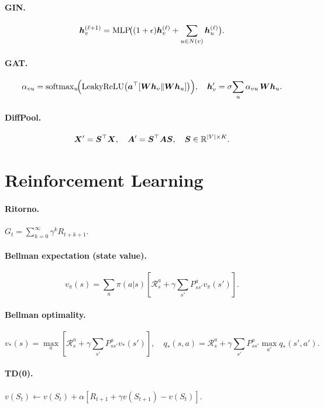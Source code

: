 \paragraph{GIN.}
\[
\bm{h}_v^{(\ell+1)} = \mathrm{MLP}\!\big((1+\epsilon)\bm{h}_v^{(\ell)} + \sum_{u\in N(v)} \bm{h}_u^{(\ell)}\big).
\]

\paragraph{GAT.}
\[
\alpha_{vu} = \mathrm{softmax}_u\!\Big(\mathrm{LeakyReLU}\big(\bm{a}^\top[\bm{W}\bm{h}_v \| \bm{W}\bm{h}_u]\big)\Big), \quad \bm{h}_v' = \sigma\!\sum_u \alpha_{vu}\,\bm{W}\bm{h}_u.
\]

\paragraph{DiffPool.}
\[
\bm{X}' = \bm{S}^\top \bm{X}, \quad \bm{A}' = \bm{S}^\top \bm{A} \bm{S}, \quad \bm{S} \in \mathbb{R}^{|V|\times K}.
\]

\section{Reinforcement Learning}

\paragraph{Ritorno.} $G_t = \sum_{k=0}^\infty \gamma^k R_{t+k+1}$.

\paragraph{Bellman expectation (state value).}
\[
v_\pi(s) = \sum_a \pi(a|s)\!\left[\mathcal{R}^a_s + \gamma \sum_{s'} P^a_{ss'} v_\pi(s')\right].
\]

\paragraph{Bellman optimality.}
\[
v_*(s) = \max_a \!\left[\mathcal{R}^a_s + \gamma\sum_{s'} P^a_{ss'} v_*(s')\right], \quad q_*(s,a) = \mathcal{R}^a_s + \gamma\sum_{s'} P^a_{ss'} \max_{a'} q_*(s', a').
\]

\paragraph{TD(0).} $v(S_t) \leftarrow v(S_t) + \alpha[R_{t+1} + \gamma v(S_{t+1}) - v(S_t)]$.

